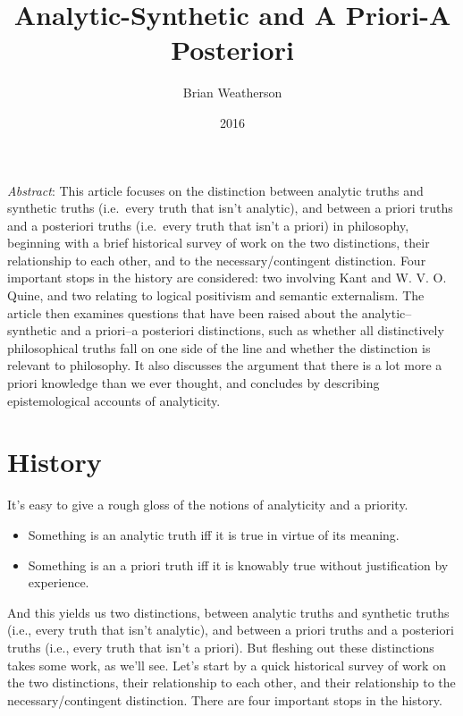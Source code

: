 \documentclass[
  11pt,
  letterpaper,
  DIV=11,
  numbers=noendperiod,
  twoside]{scrartcl}
\title{Analytic-Synthetic and A Priori-A Posteriori}
\author{Brian Weatherson}
\date{2016}
\providecommand{\tightlist}{%
  \setlength{\itemsep}{0pt}\setlength{\parskip}{0pt}}\usepackage{longtable,booktabs,array}
\renewenvironment{abstract}
 {\vspace{-1.25cm}
 \quotation\small\noindent\emph{Abstract}:}
 {\endquotation}
\begin{document}
\maketitle
\begin{abstract}
This article focuses on the distinction between analytic truths and
synthetic truths (i.e.~every truth that isn't analytic), and between a
priori truths and a posteriori truths (i.e.~every truth that isn't a
priori) in philosophy, beginning with a brief historical survey of work
on the two distinctions, their relationship to each other, and to the
necessary/contingent distinction. Four important stops in the history
are considered: two involving Kant and W. V. O. Quine, and two relating
to logical positivism and semantic externalism. The article then
examines questions that have been raised about the analytic--synthetic
and a priori--a posteriori distinctions, such as whether all
distinctively philosophical truths fall on one side of the line and
whether the distinction is relevant to philosophy. It also discusses the
argument that there is a lot more a priori knowledge than we ever
thought, and concludes by describing epistemological accounts of
analyticity.
\end{abstract}


\section{History}\label{history}

It's easy to give a rough gloss of the notions of analyticity and a
priority.

\begin{itemize}
\tightlist
\item
  Something is an analytic truth iff it is true in virtue of its
  meaning.
\item
  Something is an a priori truth iff it is knowably true without
  justification by experience.
\end{itemize}

And this yields us two distinctions, between analytic truths and
synthetic truths (i.e., every truth that isn't analytic), and between a
priori truths and a posteriori truths (i.e., every truth that isn't a
priori). But fleshing out these distinctions takes some work, as we'll
see. Let's start by a quick historical survey of work on the two
distinctions, their relationship to each other, and their relationship
to the necessary/contingent distinction. There are four important stops
in the history.
\end{document}
